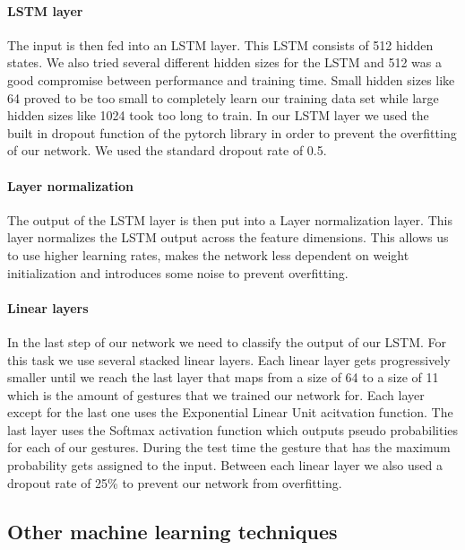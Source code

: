\documentclass[runningheads]{llncs}
\begin{document}
\paragraph{LSTM layer}
The input is then fed into an LSTM layer. This LSTM consists of 512 hidden states. We also tried several different hidden sizes for the LSTM and 512 was a good compromise between performance and training time. Small hidden sizes like 64 proved to be too small to completely learn our training data set while large hidden sizes like 1024 took too long to train. In our LSTM layer we used the built in dropout function of the pytorch library in order to prevent the overfitting of our network. We used the standard dropout rate of 0.5.
\paragraph{Layer normalization}
The output of the LSTM layer is then put into a Layer normalization layer. This layer normalizes the LSTM output across the feature dimensions. This allows us to use higher learning rates, makes the network less dependent on weight initialization and introduces some noise to prevent overfitting.
\paragraph{Linear layers}
In the last step of our network we need to classify the output of our LSTM. For this task we use several stacked linear layers. Each linear layer gets progressively smaller until we reach the last layer that maps from a size of 64 to a size of 11 which is the amount of gestures that we trained our network for. Each layer except for the last one uses the Exponential Linear Unit acitvation function. The last layer uses the Softmax activation function which outputs pseudo probabilities for each of our gestures. During the test time the gesture that has the maximum probability gets assigned to the input. Between each linear layer we also used a dropout rate of 25\% to prevent our network from overfitting.

\subsection{Other machine learning techniques}
\end{document}
